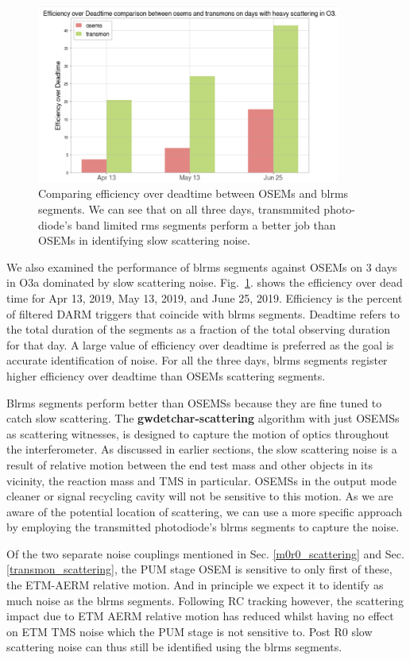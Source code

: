 \documentclass[12pt]{iopart}
\begin{document}
\begin{figure}[h]
    \centering
    \includegraphics[width=10cm]{osemstrans.png}
    \caption{Comparing efficiency over deadtime between OSEMs and blrms segments. We can see that on all three days, transmmited photo-diode's band limited rms segments perform a better job than OSEMs in identifying slow scattering noise.}
    \label{fig:osemtrans}
\end{figure}

We also examined the performance of blrms segments against OSEMs on 3 days in O3a dominated by slow scattering noise. Fig.~\ref{fig:osemtrans}. shows the efficiency over dead time for Apr 13, 2019, May 13, 2019, and June 25, 2019. Efficiency is the percent of filtered DARM triggers that coincide with blrms segments. Deadtime refers to the total duration of the segments as a fraction of the total observing duration for that day. A large value of efficiency over deadtime is preferred as the goal is accurate identification of  noise. For all the three days, blrms segments register higher efficiency over deadtime than OSEMs scattering segments.

Blrms segments perform better than OSEMSs because they are fine tuned to catch slow scattering. The \textbf{gwdetchar-scattering} algorithm with just OSEMSs as scattering witnesses, is designed to capture the motion of optics throughout the interferometer. As discussed in earlier sections, the slow scattering noise is a result of relative motion between the end test mass and other objects in its vicinity, the reaction mass and TMS in particular. OSEMSs in the output mode cleaner or signal recycling cavity will not be sensitive to this motion. As we are aware of the potential location of scattering, we can use a more specific approach by employing the transmitted photodiode’s blrms segments to capture the noise. 


Of the two separate noise couplings mentioned in Sec. \ref{m0r0_scattering}  and Sec. \ref{transmon_scattering}, the PUM stage OSEM is sensitive to only first of these, the ETM-AERM relative motion. And in principle we expect it to identify as much noise as the blrms segments. Following RC tracking however, the scattering impact due to ETM AERM relative motion has reduced whilst having no effect on ETM TMS noise which the PUM stage is not sensitive to. Post R0 slow scattering noise can thus still be identified using the blrms segments.
\end{document}
